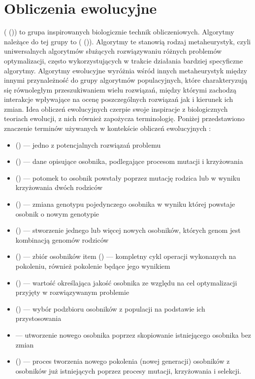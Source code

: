 \section{Obliczenia ewolucyjne}

 ( ()) to grupa inspirowanych biologicznie technik obliczeniowych. 
Algorytmy należące do tej grupy to  ( ()). Algorytmy te stanowią rodzaj metaheurystyk, czyli uniwersalnych algorytmów służących rozwiązywaniu różnych problemów optymalizacji, często wykorzystujących w trakcie działania bardziej specyficzne algorytmy. Algorytmy ewolucyjne wyróżnia wśród innych metaheurystyk między innymi przynależność do grupy algorytmów populacyjnych, które charakteryzują się równoległym przeszukiwaniem wielu rozwiązań, między którymi zachodzą interakcje wpływające na ocenę poszczególnych rozwiązań jak i kierunek ich zmian. Idea obliczeń ewolucyjnych czerpie swoje inspiracje z biologicznych teoriach ewolucji, z nich również zapożycza terminologię. Poniżej przedstawiono znaczenie terminów używanych w kontekście obliczeń ewolucyjnych \cite{Luke2009Metaheuristics}:

\begin{itemize}
	\item {} () --- jedno z potencjalnych rozwiązań problemu
	\item {} () --- dane opisujące osobnika, podlegające procesom mutacji i krzyżowania
	\item {} () --- potomek to osobnik powstały poprzez mutację rodzica lub w wyniku krzyżowania dwóch rodziców
	\item {} () --- zmiana genotypu pojedynczego osobnika w wyniku której powstaje osobnik o nowym genotypie
	\item {} () --- stworzenie jednego lub więcej nowych osobników, których genom jest kombinacją genomów rodziców
	\item {} () --- zbiór osobników
	item  () --- kompletny cykl operacji wykonanych na pokoleniu, również pokolenie będące jego wynikiem
	\item {} () --- wartość określająca jakość osobnika ze względu na cel optymalizacji przyjęty w rozwiązywanym problemie
	\item {} () --- wybór podzbioru osobników z populacji na podstawie ich przystosowania
	\item {} --- utworzenie nowego osobnika poprzez skopiowanie istniejącego osobnika bez zmian
	\item {} () --- proces tworzenia nowego pokolenia (nowej generacji) osobników z osobników już istniejących poprzez procesy mutacji, krzyżowania i selekcji.
\end{itemize}

